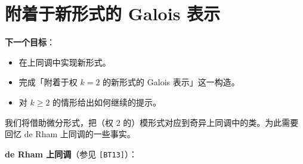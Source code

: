 \chapter{附着于新形式的 Galois 表示}

\noindent\textbf{下一个目标}：
\begin{itemize}
\item 在上同调中实现新形式。
\item 完成「附着于权 $k=2$ 的新形式的 Galois 表示」这一构造。
\item 对 $k\ge2$ 的情形给出如何继续的提示。
\end{itemize}

我们将借助微分形式，把（权 $2$ 的）模形式对应到奇异上同调中的类。为此需要回忆 de Rham 上同调的一些事实。

\noindent\textbf{de Rham 上同调}（参见 \texttt{[BT13]}）：
